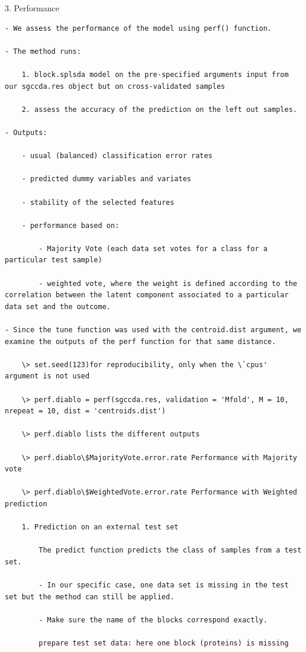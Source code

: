 \documentclass[
]{book}
\begin{document}
3. Performance

\begin{verbatim}
- We assess the performance of the model using perf() function.

- The method runs:

    1. block.splsda model on the pre-specified arguments input from our sgccda.res object but on cross-validated samples

    2. assess the accuracy of the prediction on the left out samples.

- Outputs:

    - usual (balanced) classification error rates

    - predicted dummy variables and variates

    - stability of the selected features

    - performance based on:

        - Majority Vote (each data set votes for a class for a particular test sample)

        - weighted vote, where the weight is defined according to the correlation between the latent component associated to a particular data set and the outcome.

- Since the tune function was used with the centroid.dist argument, we examine the outputs of the perf function for that same distance.

    \> set.seed(123)for reproducibility, only when the \`cpus' argument is not used

    \> perf.diablo = perf(sgccda.res, validation = 'Mfold', M = 10, nrepeat = 10, dist = 'centroids.dist')

    \> perf.diablo lists the different outputs

    \> perf.diablo\$MajorityVote.error.rate Performance with Majority vote

    \> perf.diablo\$WeightedVote.error.rate Performance with Weighted prediction

    1. Prediction on an external test set

        The predict function predicts the class of samples from a test set.

        - In our specific case, one data set is missing in the test set but the method can still be applied.

        - Make sure the name of the blocks correspond exactly.

        prepare test set data: here one block (proteins) is missing


\end{verbatim}
\end{document}
